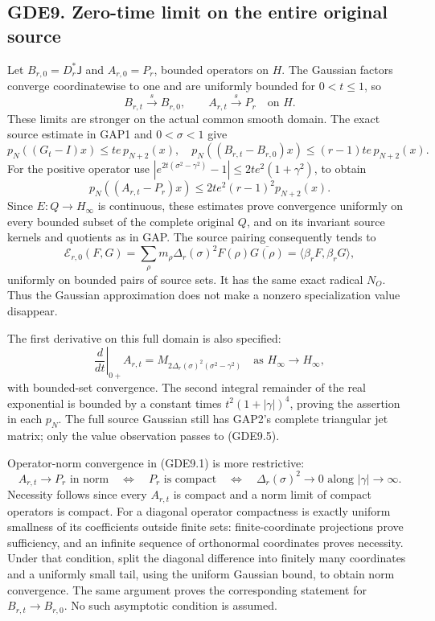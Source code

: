 \subsection{GDE9. Zero-time limit on the entire original
source}\label{gde9.-zero-time-limit-on-the-entire-original-source}

Let \(B_{r,0}=D_r^*\mathsf J\) and \(A_{r,0}=P_r\), bounded operators on
\(H\). The Gaussian factors converge coordinatewise to one and are
uniformly bounded for \(0<t\le1\), so \[
B_{r,t}\xrightarrow{s}B_{r,0},\qquad
A_{r,t}\xrightarrow{s}P_r\quad\text{on }H.
\tag{GDE9.1}
\] These limits are stronger on the actual common smooth domain. The
exact source estimate in GAP1 and \(0<\sigma<1\) give \[
p_N((G_t-I)x)\le te\,p_{N+2}(x),
\quad
p_N((B_{r,t}-B_{r,0})x)\le(r-1)te\,p_{N+2}(x).
\tag{GDE9.2}
\] For the positive operator use \(|e^{2t(\sigma^2-\gamma^2)}-1|
\le2te^2(1+\gamma^2)\), to obtain \[
p_N((A_{r,t}-P_r)x)
\le2te^2(r-1)^2p_{N+2}(x).
\tag{GDE9.3}
\] Since \(E:Q\to H_\infty\) is continuous, these estimates prove
convergence uniformly on every bounded subset of the complete original
\(Q\), and on its invariant source kernels and quotients as in GAP. The
source pairing consequently tends to \[
\mathcal E_{r,0}(F,G)=\sum_\rho m_\rho\Delta_r(\sigma)^2
F(\rho)\overline{G(\rho)}=\langle\beta_rF,\beta_rG\rangle,
\tag{GDE9.4}
\] uniformly on bounded pairs of source sets. It has the same exact
radical \(N_O\). Thus the Gaussian approximation does not make a nonzero
specialization value disappear.

The first derivative on this full domain is also specified: \[
\left.\frac d{dt}\right|_{0+}A_{r,t}
=M_{2\Delta_r(\sigma)^2(\sigma^2-\gamma^2)}
\quad\text{as }H_\infty\to H_\infty,
\tag{GDE9.5}
\] with bounded-set convergence. The second integral remainder of the
real exponential is bounded by a constant times \(t^2(1+|\gamma|)^4\),
proving the assertion in each \(p_N\). The full source Gaussian still
has GAP2's complete triangular jet matrix; only the value observation
passes to (GDE9.5).

Operator-norm convergence in (GDE9.1) is more restrictive: \[
A_{r,t}\to P_r\text{ in norm}
\quad\Longleftrightarrow\quad P_r\text{ is compact}
\quad\Longleftrightarrow\quad
\Delta_r(\sigma)^2\to0\text{ along }|\gamma|\to\infty.
\tag{GDE9.6}
\] Necessity follows since every \(A_{r,t}\) is compact and a norm limit
of compact operators is compact. For a diagonal operator compactness is
exactly uniform smallness of its coefficients outside finite sets:
finite-coordinate projections prove sufficiency, and an infinite
sequence of orthonormal coordinates proves necessity. Under that
condition, split the diagonal difference into finitely many coordinates
and a uniformly small tail, using the uniform Gaussian bound, to obtain
norm convergence. The same argument proves the corresponding statement
for \(B_{r,t}\to B_{r,0}\). No such asymptotic condition is assumed.

